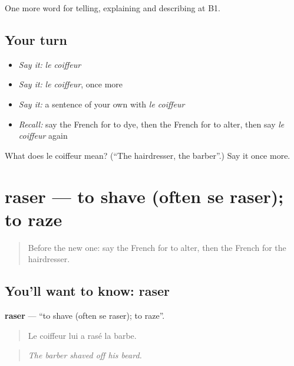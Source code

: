 \begin{grammarlens}[title={What you've built}]
One more word for telling, explaining and describing at B1.
\end{grammarlens}

\subsection*{Your turn}
\begin{itemize}
\raggedright
  \item \emph{Say it:} \emph{le coiffeur}
  \item \emph{Say it:} \emph{le coiffeur}, once more
  \item \emph{Say it:} a sentence of your own with \emph{le coiffeur}
  \item \emph{Recall:} say the French for to dye, then the French for to alter, then say \emph{le coiffeur} again
\end{itemize}

\begin{tcolorbox}[breakable,colback=teal!4,colframe=teal!35!black,title={Before you move on}]
What does le coiffeur mean? (\textquotedblleft{}The hairdresser, the barber\textquotedblright{}.) Say it once more.
\end{tcolorbox}
\section[raser]{raser — to shave (often se raser); to raze}

\label{lesson:FR-C448-raser}



\begin{quote}
Before the new one: say the French for to alter, then the French for the hairdresser.
\end{quote}

\subsection*{You'll want to know: raser}
\textbf{raser} — \textquotedblleft{}to shave (often se raser); to raze\textquotedblright{}.

\begin{quote}
Le coiffeur lui a rasé la barbe.
\end{quote}

\begin{quote}
\emph{The barber shaved off his beard.}
\end{quote}

